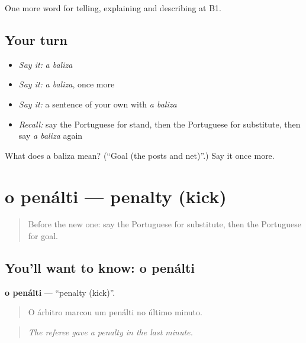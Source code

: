 \begin{grammarlens}[title={What you've built}]
One more word for telling, explaining and describing at B1.
\end{grammarlens}

\subsection*{Your turn}
\begin{itemize}
\raggedright
  \item \emph{Say it:} \emph{a baliza}
  \item \emph{Say it:} \emph{a baliza}, once more
  \item \emph{Say it:} a sentence of your own with \emph{a baliza}
  \item \emph{Recall:} say the Portuguese for stand, then the Portuguese for substitute, then say \emph{a baliza} again
\end{itemize}

\begin{tcolorbox}[breakable,colback=teal!4,colframe=teal!35!black,title={Before you move on}]
What does a baliza mean? (\textquotedblleft{}Goal (the posts and net)\textquotedblright{}.) Say it once more.
\end{tcolorbox}
\section[o penálti]{o penálti — penalty (kick)}

\label{lesson:PT-C509-penalti}



\begin{quote}
Before the new one: say the Portuguese for substitute, then the Portuguese for goal.
\end{quote}

\subsection*{You'll want to know: o penálti}
\textbf{o penálti} — \textquotedblleft{}penalty (kick)\textquotedblright{}.

\begin{quote}
O árbitro marcou um penálti no último minuto.
\end{quote}

\begin{quote}
\emph{The referee gave a penalty in the last minute.}
\end{quote}

